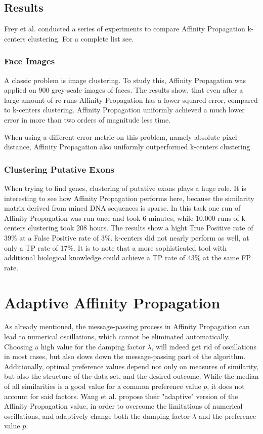 \documentclass[11pt,a4paper]{article}
\begin{document}
\subsection{Results}
Frey et al. conducted a series of experiments to compare Affinity Propagation k-centers clustering. For a complete list see\cite{frey2007clustering}.
\subsubsection{Face Images}
A classic problem is image clustering. To study this, Affinity Propagation was applied on 900 grey-scale images of faces. The results show, that even after a large amount of re-runs Affinity Propagation has a lower squared error, compared to k-centers clustering. Affinity Propagation uniformly achieved a much lower error in more than two orders of magnitude less time.\cite{frey2007clustering}

When using a different error metric on this problem, namely absolute pixel distance, Affinity Propagation also uniformly outperformed k-centers clustering. \cite{frey2007clustering}
\subsubsection{Clustering Putative Exons}
When trying to find genes, clustering of putative exons plays a huge role.\cite{frey2007clustering} It is interesting to see how Affinity Propagation performs here, because the similarity matrix derived from mined DNA sequences is sparse. In this task one run of Affinity Propagation was run once and took 6 minutes, while 10.000 runs of k-centers clustering took 208 hours. The results show a hight True Positive rate of 39\% at a False Positive rate of 3\%. k-centers did not nearly perform as well, at only a TP rate of 17\%. It is to note that a more sophisticated tool with additional biological knowledge could achieve a TP rate of 43\% at the same FP rate.\cite{frey2007clustering}
\pagebreak
\section{Adaptive Affinity Propagation}
As already mentioned, the message-passing process in Affinity Propagation can lead to numerical oscillations, which cannot be eliminated automatically. Choosing a high value for the damping factor $\lambda$, will indeed get rid of oscillations in most cases, but also slows down the message-passing part of the algorithm. Additionally, optimal preference values depend not only on measures of similarity, but also the structure of the data set, and the desired outcome. While the median of all similarities is a good value for a common preference value $p$, it does not account for said factors. Wang et al. propose their "adaptive" version of the Affinity Propagation value, in order to overcome the limitations of numerical oscillations, and adaptively change both the damping factor $\lambda$ and the preference value $p$.\cite{wang2008adaptive}
\end{document}
